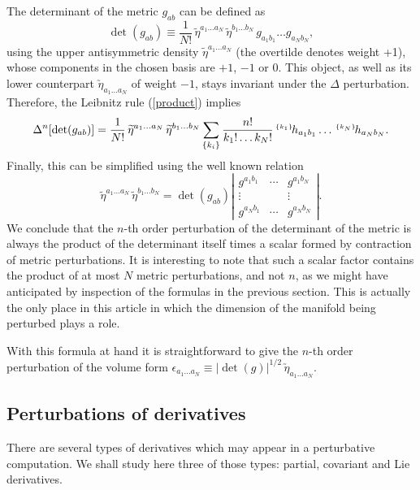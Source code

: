 \documentclass[aps,prd,showpacs]{revtex4}
\newcommand{\pert}[2]{{}^{\mbox{\,\tiny $\{#1\}\!$}}{#2}}
\begin{document}
The determinant of the metric $g_{ab}$ can be defined as
\begin{equation}
\det(g_{ab})\equiv \frac{1}{N!}\,\widetilde\eta^{a_1\dots a_N}\,\widetilde\eta^{b_1\dots b_N}\,g_{a_1b_1}\dots g_{a_Nb_N},
\end{equation}
using the upper antisymmetric density $\widetilde\eta^{a_1\dots a_N}$
(the overtilde denotes weight +1), whose components
in the chosen basis are $+1$, $-1$ or $0$. This object, as well as its
lower counterpart $\utilde\eta_{a_1\dots a_N}$ of weight $-1$, stays invariant under
the $\Delta$ perturbation. Therefore, the Leibnitz rule (\ref{product}) implies
\begin{equation}\label{pertDet}
\Delta^n[\det(g_{ab})]=\frac{1}{N!}\,
\widetilde\eta^{a_1\dots a_N}\,\widetilde\eta^{b_1\dots b_N}
\sum_{\{k_i\}} \frac{n!}{k_1!\dots k_N!}\pert{k_1}{h}_{a_1b_1}\dots\pert{k_N}{h}_{a_Nb_N}.
\end{equation}
Finally, this can be simplified using the well known relation
\begin{equation}
\widetilde\eta^{a_1\dots a_N}\,\widetilde\eta^{b_1\dots b_N}
= \det(g_{ab})
\left|
\begin{array}{ccc}
g^{a_1b_1} & \cdots & g^{a_1b_N} \\
\vdots & & \vdots \\
g^{a_Nb_1} & \cdots & g^{a_Nb_N} 
\end{array}
\right| .
\end{equation}
We conclude that the $n$-th order perturbation of the determinant of the
metric is always the product of the determinant itself times a scalar
formed by contraction of metric perturbations.
It is interesting to note that such a scalar factor contains the product
of at most $N$ metric perturbations, and not $n$, as we might have
anticipated by inspection of the formulas in the previous section.
This is actually the only place in this article in which the dimension
of the manifold being perturbed plays a role.

With this formula at hand it is straightforward to give the
$n$-th order perturbation of the volume form
$\epsilon_{a_1\dots a_N}\equiv
|\det(g)|^{1/2}\, \utilde\eta_{a_1\dots a_N}$.

\subsection{Perturbations of derivatives}
There are several types of derivatives which may appear in a perturbative
computation. We shall study here three of those types: partial,
covariant and Lie derivatives.
\end{document}
